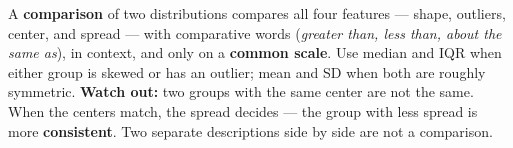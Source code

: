 \documentclass[12pt]{article}
\begin{document}
\vspace{0.14in}

\begin{remindbox}
\small
A \textbf{comparison} of two distributions compares all four features --- shape, outliers,
center, and spread --- with comparative words (\emph{greater than, less than, about the same
as}), in context, and only on a \textbf{common scale}. Use median and IQR when either group is
skewed or has an outlier; mean and SD when both are roughly symmetric. \textbf{Watch out:} two
groups with the same center are not the same. When the centers match, the spread decides ---
the group with less spread is more \textbf{consistent}. Two separate descriptions side by side
are not a comparison.
\end{remindbox}
\end{document}
